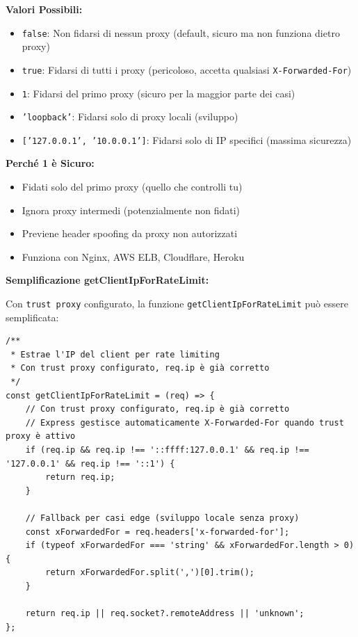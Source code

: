 \documentclass[11pt,a4paper]{article}
\newcommand{\code}[1]{\texttt{#1}}
\begin{document}
\textbf{Valori Possibili:}
\begin{itemize}
    \item \code{false}: Non fidarsi di nessun proxy (default, sicuro ma non funziona dietro proxy)
    \item \code{true}: Fidarsi di tutti i proxy (pericoloso, accetta qualsiasi \code{X-Forwarded-For})
    \item \code{1}: Fidarsi del primo proxy (sicuro per la maggior parte dei casi)
    \item \code{'loopback'}: Fidarsi solo di proxy locali (sviluppo)
    \item \code{['127.0.0.1', '10.0.0.1']}: Fidarsi solo di IP specifici (massima sicurezza)
\end{itemize}

\textbf{Perché 1 è Sicuro:}
\begin{itemize}
    \item Fidati solo del primo proxy (quello che controlli tu)
    \item Ignora proxy intermedi (potenzialmente non fidati)
    \item Previene header spoofing da proxy non autorizzati
    \item Funziona con Nginx, AWS ELB, Cloudflare, Heroku
\end{itemize}

\textbf{Semplificazione getClientIpForRateLimit:}

Con \code{trust proxy} configurato, la funzione \code{getClientIpForRateLimit} può essere semplificata:

\begin{lstlisting}[caption=Funzione Semplificata con Trust Proxy]
/**
 * Estrae l'IP del client per rate limiting
 * Con trust proxy configurato, req.ip è già corretto
 */
const getClientIpForRateLimit = (req) => {
    // Con trust proxy configurato, req.ip è già corretto
    // Express gestisce automaticamente X-Forwarded-For quando trust proxy è attivo
    if (req.ip && req.ip !== '::ffff:127.0.0.1' && req.ip !== '127.0.0.1' && req.ip !== '::1') {
        return req.ip;
    }

    // Fallback per casi edge (sviluppo locale senza proxy)
    const xForwardedFor = req.headers['x-forwarded-for'];
    if (typeof xForwardedFor === 'string' && xForwardedFor.length > 0) {
        return xForwardedFor.split(',')[0].trim();
    }

    return req.ip || req.socket?.remoteAddress || 'unknown';
};
\end{lstlisting}
\end{document}
